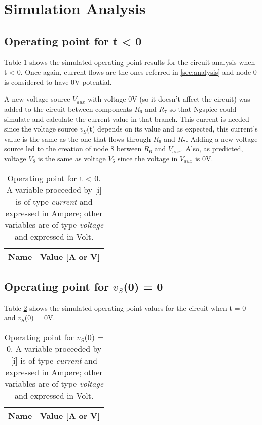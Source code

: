 \section{Simulation Analysis}
\label{sec:simulation}

\subsection{Operating point for t < 0}

Table \ref{tab:op_1} %
 shows the simulated operating point results for the circuit analysis when t < 0. Once again, current flows are the ones referred in \ref{sec:analysis} and node 0 is considered to have 0V potential. \par
 A new voltage source $V_{aux}$ with voltage 0V (so it doesn't affect the circuit) was added to the circuit between components $R_6$ and $R_7$ so that Ngspice could simulate and calculate the current value in that branch. This current is needed since the voltage source $v_S$(t) depends on its value and as expected, this current's value is the same as the one that flows through $R_6$ and $R_7$. Adding a new voltage source led to the creation of node 8 between $R_6$ and $V_{aux}$. Also, as predicted, voltage $V_8$ is the same as voltage $V_6$ since the voltage in $V_{aux}$ is 0V.

\begin{table}[h]
  \centering
  \begin{tabular}{|l|r|}
    \hline    
    {\bf Name} & {\bf Value [A or V]} \\ \hline
    
  \end{tabular}
  \caption{Operating point for t < 0. A variable proceeded by [i] is of type {\em current}
    and expressed in Ampere; other variables are of type {\it voltage} and expressed in
    Volt.}
  \label{tab:op_1}
\end{table}
\FloatBarrier

\subsection{Operating point for $v_S$(0) = 0}

Table \ref{tab:op_2}%
shows the simulated operating point values for the circuit when t = 0 and $v_S$(0) = 0V. 

\begin{table}[h]
  \centering
  \begin{tabular}{|l|r|}
    \hline    
    {\bf Name} & {\bf Value [A or V]} \\ \hline
    
  \end{tabular}
  \caption{Operating point for $v_S$(0) = 0. A variable proceeded by [i] is of type {\em current}
    and expressed in Ampere; other variables are of type {\it voltage} and expressed in
    Volt.}
  \label{tab:op_2}
\end{table}
\FloatBarrier

